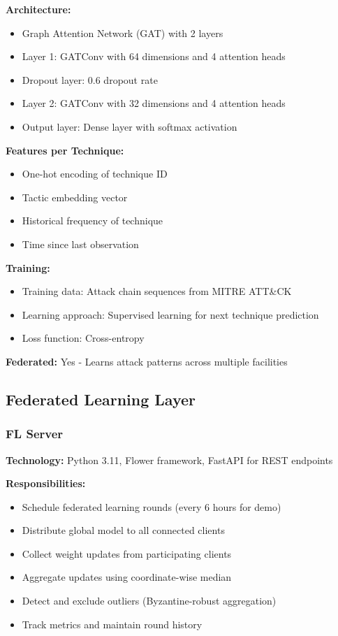 \documentclass[12pt,a4paper]{article}
\begin{document}
\textbf{Architecture:}
\begin{itemize}[leftmargin=1cm,itemsep=0pt]
    \item Graph Attention Network (GAT) with 2 layers
    \item Layer 1: GATConv with 64 dimensions and 4 attention heads
    \item Dropout layer: 0.6 dropout rate
    \item Layer 2: GATConv with 32 dimensions and 4 attention heads
    \item Output layer: Dense layer with softmax activation
\end{itemize}

\textbf{Features per Technique:}
\begin{itemize}[leftmargin=1cm,itemsep=0pt]
    \item One-hot encoding of technique ID
    \item Tactic embedding vector
    \item Historical frequency of technique
    \item Time since last observation
\end{itemize}

\textbf{Training:}
\begin{itemize}[leftmargin=1cm,itemsep=0pt]
    \item Training data: Attack chain sequences from MITRE ATT\&CK
    \item Learning approach: Supervised learning for next technique prediction
    \item Loss function: Cross-entropy
\end{itemize}

\textbf{Federated:} Yes - Learns attack patterns across multiple facilities

\subsection{Federated Learning Layer}

\subsubsection{FL Server}

\textbf{Technology:} Python 3.11, Flower framework, FastAPI for REST endpoints

\textbf{Responsibilities:}
\begin{itemize}[leftmargin=1cm,itemsep=0pt]
    \item Schedule federated learning rounds (every 6 hours for demo)
    \item Distribute global model to all connected clients
    \item Collect weight updates from participating clients
    \item Aggregate updates using coordinate-wise median
    \item Detect and exclude outliers (Byzantine-robust aggregation)
    \item Track metrics and maintain round history
\end{itemize}
\end{document}
